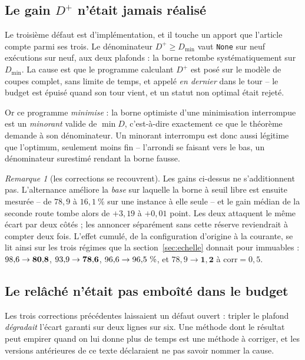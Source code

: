 \documentclass[11pt,a4paper]{article}
\theoremstyle{plain}
\theoremstyle{remark}
\newtheorem{remark}{Remarque}
\begin{document}
\subsection{Le gain $D^{+}$ n'était jamais réalisé}

Le troisième défaut est d'implémentation, et il touche un apport que
l'article compte parmi ses trois. Le dénominateur $D^{+}\ge D_{\min}$ vaut
\texttt{None} sur neuf exécutions sur neuf, aux deux plafonds : la borne
retombe systématiquement sur $D_{\min}$. La cause est que le programme
calculant $D^{+}$ est posé sur le modèle de coupes complet, sans limite de
temps, et appelé \emph{en dernier} dans le tour -- le budget est épuisé
quand son tour vient, et un statut non optimal était rejeté.

Or ce programme \emph{minimise} : la borne optimiste d'une minimisation
interrompue est un \emph{minorant} valide de $\min D$, c'est-à-dire
exactement ce que le théorème demande à son dénominateur. Un minorant
interrompu est donc aussi légitime que l'optimum, seulement moins fin --
l'arrondi se faisant vers le bas, un dénominateur surestimé rendant la borne
fausse.

\begin{remark}[les corrections se recouvrent]
Les gains ci-dessus ne s'additionnent pas. L'alternance améliore la
\emph{base} sur laquelle la borne à seuil libre est ensuite mesurée -- de
$78{,}9$ à $16{,}1\ \%$ sur une instance à elle seule -- et le gain médian de
la seconde route tombe alors de $+3{,}19$ à $+0{,}01$ point. Les deux
attaquent le même écart par deux côtés ; les annoncer séparément sans cette
réserve reviendrait à compter deux fois. L'effet cumulé, de la configuration
d'origine à la courante, se lit ainsi sur les trois régimes que la
section~\ref{sec:echelle} donnait pour immuables :
$98{,}6{}\to\mathbf{80{,}8{}}$, $93{,}9{}\to\mathbf{78{,}6{}}$,
$96{,}6{}\to 96{,}5{}\ \%$, et $78{,}9\to\mathbf{1{,}2}$ à $\text{corr}=0{,}5$.
\end{remark}

\subsection{Le relâché n'était pas emboîté dans le budget}
\label{sec:emboite}

Les trois corrections précédentes laissaient un défaut ouvert : tripler le
plafond \emph{dégradait} l'écart garanti sur deux lignes sur six. Une
méthode dont le résultat peut empirer quand on lui donne plus de temps est
une méthode à corriger, et les versions antérieures de ce texte déclaraient
ne pas savoir nommer la cause.
\end{document}
